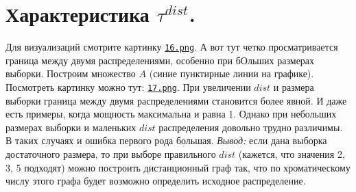 \documentclass{report}
\begin{document}
\section{Характеристика $\tau^{dist}$.}
Для визуализаций смотрите картинку \texttt{\href{https://github.com/misshimichka/dm-random-graphs/blob/report/report/16.png}{16.png}}.
\newline
\newline
А вот тут четко просматривается граница между двумя распределениями, особенно при бОльших размерах выборки. Построим множество $A$ (синие пунктирные линии на графике).
\newline
\newline
Посмотреть картинку можно тут: \texttt{\href{https://github.com/misshimichka/dm-random-graphs/blob/report/report/17.png}{17.png}}.
\newline
\newline
При увеличении $dist$ и размера выборки граница между двумя распределениями становится более явной. И даже есть примеры, когда мощность максимальна и равна 1.
Однако при небольших размерах выборки и маленьких $dist$ распределения довольно трудно различимы. В таких случаях и ошибка первого рода большая.
\newline
\newline
\emph{Вывод:} если дана выборка достаточного размера, то при выборе правильного $dist$ (кажется, что значения 2, 3, 5 подходят) можно построить дистанционный граф так, что по хроматическому числу этого графа будет возможно определить исходное распределение.
\end{document}
